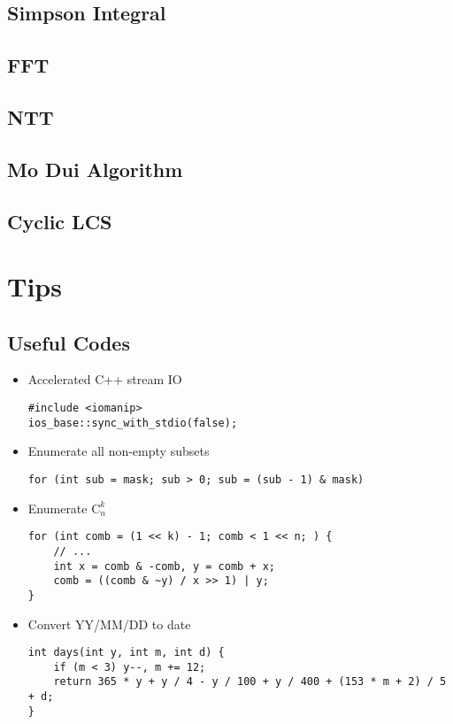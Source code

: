 ﻿\documentclass[10pt]{article}
\begin{document}
{\subsection{Simpson Integral}

\subsection{FFT}

\subsection{NTT}

\subsection{Mo Dui Algorithm}

\subsection{Cyclic LCS}

% 
\section{Tips}
\subsection{Useful Codes}
\begin{itemize}
\item Accelerated C++ stream IO
\begin{lstlisting}[frame=none]
#include <iomanip>
ios_base::sync_with_stdio(false);
\end{lstlisting}
\item Enumerate all non-empty subsets
\begin{lstlisting}[frame=none]
for (int sub = mask; sub > 0; sub = (sub - 1) & mask)
\end{lstlisting}
\item Enumerate $\mathrm{C}_{n}^{k}$
\begin{lstlisting}[frame=none]
for (int comb = (1 << k) - 1; comb < 1 << n; ) {
	// ...
	int x = comb & -comb, y = comb + x;
	comb = ((comb & ~y) / x >> 1) | y;
}
\end{lstlisting}
\item Convert YY/MM/DD to date
\begin{lstlisting}[frame=none]
int days(int y, int m, int d) {
	if (m < 3) y--, m += 12;
	return 365 * y + y / 4 - y / 100 + y / 400 + (153 * m + 2) / 5 + d;
}
\end{lstlisting}
\end{itemize}
}
\end{document}
